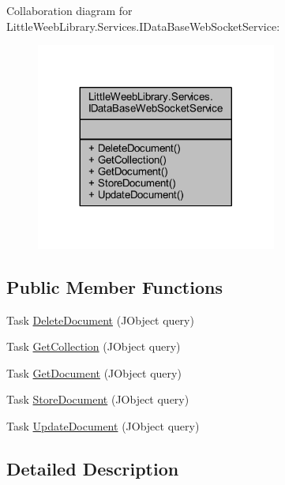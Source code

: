 Collaboration diagram for Little\+Weeb\+Library.\+Services.\+I\+Data\+Base\+Web\+Socket\+Service\+:\nopagebreak
\begin{figure}[H]
\begin{center}
\leavevmode
\includegraphics[width=224pt]{interface_little_weeb_library_1_1_services_1_1_i_data_base_web_socket_service__coll__graph}
\end{center}
\end{figure}
\subsection*{Public Member Functions}
\begin{DoxyCompactItemize}
\item 
Task \mbox{\hyperlink{interface_little_weeb_library_1_1_services_1_1_i_data_base_web_socket_service_a4411fbc1801df45d63aa3a0624891ef6}{Delete\+Document}} (J\+Object query)
\item 
Task \mbox{\hyperlink{interface_little_weeb_library_1_1_services_1_1_i_data_base_web_socket_service_aeeeecbdfb73e0242a2d36f8d1d88b6ee}{Get\+Collection}} (J\+Object query)
\item 
Task \mbox{\hyperlink{interface_little_weeb_library_1_1_services_1_1_i_data_base_web_socket_service_abe25bfca603db07eb94658e65d0627dc}{Get\+Document}} (J\+Object query)
\item 
Task \mbox{\hyperlink{interface_little_weeb_library_1_1_services_1_1_i_data_base_web_socket_service_a94ab5dc454950814a3e6346e14219a87}{Store\+Document}} (J\+Object query)
\item 
Task \mbox{\hyperlink{interface_little_weeb_library_1_1_services_1_1_i_data_base_web_socket_service_a8b70c95afacce9abbd2d70c77b22c51a}{Update\+Document}} (J\+Object query)
\end{DoxyCompactItemize}


\subsection{Detailed Description}


